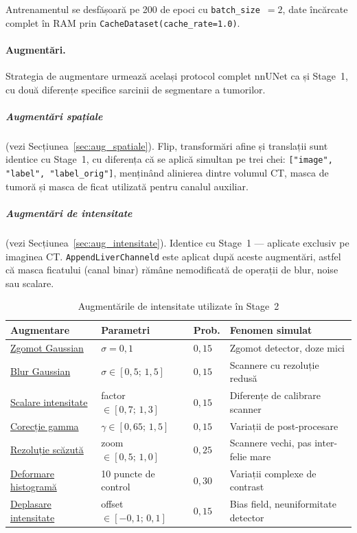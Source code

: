 \documentclass[12pt, a4paper]{report}
\begin{document}
Antrenamentul se desfășoară pe 200 de epoci cu
\texttt{batch\_size}~$= 2$, date încărcate complet în RAM prin
\texttt{CacheDataset(cache\_rate=1.0)}.

\paragraph{Augmentări.}
Strategia de augmentare urmează același protocol complet
nnUNet ca și Stage~1, cu două diferențe
specifice sarcinii de segmentare a tumorilor.

\subparagraph{Augmentări spațiale}
(vezi Secțiunea~\ref{sec:aug_spatiale}).
Flip, transformări afine și translații sunt identice cu Stage~1,
cu diferența că se aplică simultan pe trei chei:
\texttt{["image", "label", "label\_orig"]}, menținând alinierea
dintre volumul CT, masca de tumoră și masca de ficat utilizată
pentru canalul auxiliar.

\subparagraph{Augmentări de intensitate}
(vezi Secțiunea~\ref{sec:aug_intensitate}).
Identice cu Stage~1 — aplicate exclusiv pe imaginea CT.
\texttt{AppendLiverChanneld} este aplicat după aceste
augmentări, astfel că masca ficatului (canal binar) rămâne
nemodificată de operații de blur, noise sau scalare.

\begin{table}[H]
    \centering
    \caption{Augmentările de intensitate utilizate în Stage~2}
    \label{tab:aug_intensitate_s2}
    \begin{tabular}{llll}
        \toprule
        \textbf{Augmentare} & \textbf{Parametri} &
        \textbf{Prob.} & \textbf{Fenomen simulat} \\
        \midrule
        \hyperref[sec:gaussnoise]{Zgomot Gaussian}
            & $\sigma = 0{,}1$          & $0{,}15$
            & Zgomot detector, doze mici \\
        \hyperref[sec:gausssmooth]{Blur Gaussian}
            & $\sigma \in [0{,}5;\,1{,}5]$ & $0{,}15$
            & Scannere cu rezoluție redusă \\
        \hyperref[sec:scaleintensity]{Scalare intensitate}
            & factor $\in [0{,}7;\,1{,}3]$ & $0{,}15$
            & Diferențe de calibrare scanner \\
        \hyperref[sec:adjustcontrast]{Corecție gamma}
            & $\gamma \in [0{,}65;\,1{,}5]$ & $0{,}15$
            & Variații de post-procesare \\
        \hyperref[sec:lowres]{Rezoluție scăzută}
            & zoom $\in [0{,}5;\,1{,}0]$ & $0{,}25$
            & Scannere vechi, pas inter-felie mare \\
        \hyperref[sec:histshift]{Deformare histogramă}
            & 10 puncte de control       & $0{,}30$
            & Variații complexe de contrast \\
        \hyperref[sec:shiftintensity]{Deplasare intensitate}
            & offset $\in [-0{,}1;\,0{,}1]$ & $0{,}15$
            & Bias field, neuniformitate detector \\
        \bottomrule
    \end{tabular}
\end{table}
\end{document}
